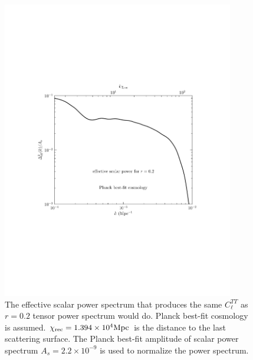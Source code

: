 \documentclass[11pt]{article}
\def \figwidth{0.9\textwidth}
\begin{document}
\begin{figure}
  \includegraphics[width = \figwidth, trim = 1in 3in 1in 3in]{ten_eff_ps.pdf}
  \caption{The effective scalar power spectrum that produces the same $C_\ell^{TT}$ as $r=0.2$ tensor power spectrum would do. Planck best-fit cosmology is assumed. $\chi_{\rm rec} = 1.394\times 10^{4} {\rm Mpc}$ is the distance to the last scattering surface. The Planck best-fit amplitude of scalar power spectrum $A_s = 2.2\times 10^{-9}$ is used to normalize the power spectrum. \label{fig:effps}}
\end{figure}
\end{document}
